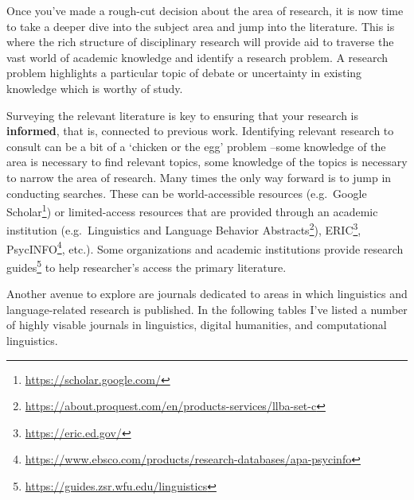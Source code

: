 \documentclass[
]{article}
\DeclareRobustCommand{\href}[2]{#2\footnote{\url{#1}}}
\begin{document}
Once you've made a rough-cut decision about the area of research, it is now time to take a deeper dive into the subject area and jump into the literature. This is where the rich structure of disciplinary research will provide aid to traverse the vast world of academic knowledge and identify a research problem. A research problem highlights a particular topic of debate or uncertainty in existing knowledge which is worthy of study.

Surveying the relevant literature is key to ensuring that your research is \textbf{informed}, that is, connected to previous work. Identifying relevant research to consult can be a bit of a `chicken or the egg' problem --some knowledge of the area is necessary to find relevant topics, some knowledge of the topics is necessary to narrow the area of research. Many times the only way forward is to jump in conducting searches. These can be world-accessible resources (e.g.~\href{https://scholar.google.com/}{Google Scholar}) or limited-access resources that are provided through an academic institution (e.g.~\href{https://about.proquest.com/en/products-services/llba-set-c}{Linguistics and Language Behavior Abstracts}), \href{https://eric.ed.gov/}{ERIC}, \href{https://www.ebsco.com/products/research-databases/apa-psycinfo}{PsycINFO}, etc.). Some organizations and academic institutions provide \href{https://guides.zsr.wfu.edu/linguistics}{research guides} to help researcher's access the primary literature.

Another avenue to explore are journals dedicated to areas in which linguistics and language-related research is published. In the following tables I've listed a number of highly visable journals in linguistics, digital humanities, and computational linguistics.
\end{document}
